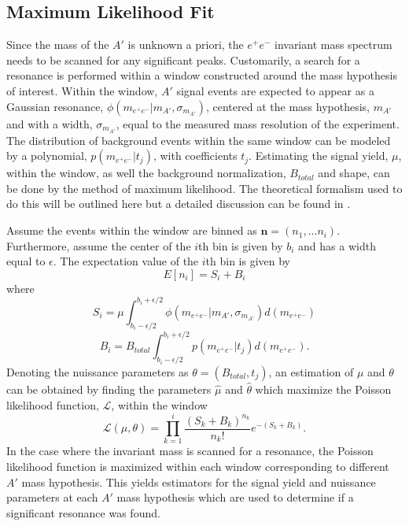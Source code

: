 \subsection{Maximum Likelihood Fit}

Since the mass of the $A'$ is unknown a priori, the 
$e^+e^-$ invariant mass spectrum needs to be scanned for any significant peaks.
Customarily, a search for a resonance is performed within a
window constructed around the mass hypothesis of interest.  Within the window, $A'$ 
signal events are expected to appear as a Gaussian resonance, 
$\phi(m_{e^+e^-} | m_{A'}, \sigma_{m_{A'}})$, centered at
the mass hypothesis, $m_{A'}$ and with a width, $\sigma_{m_{A'}}$, equal to the
 measured mass resolution of
the experiment.  The distribution of background events within the same window
can be modeled by a polynomial, $p(m_{e^+e^-} | t_j)$, with coefficients $t_j$.  Estimating the 
signal yield, $\mu$, within
the window, as well the background normalization, $B_{total}$ and shape, can be
done by the method of maximum likelihood.  The theoretical formalism
used to do this will be outlined here but a detailed discussion can be found in
\cite{Cowan:2010js}.

Assume the events within the window are binned as $\mathbf{n} = (n_{1}, ... n_{i})$.
Furthermore, assume the center of the $i$th bin is given by $b_i$ and has a width
equal to $\epsilon$. 
The expectation value of the $i$th bin is given by 
\begin{equation}
    E[n_i] = S_{i} + B_{i}
\end{equation}
where 
\begin{equation}
    S_{i} = \mu \int_{b_i - \epsilon/2}^{b_i + \epsilon/2} \phi(m_{e^+e^-} | m_{A'}, \sigma_{m_{A'}}) d (m_{e^+e^-})
\end{equation} 
\begin{equation}
    B_{i} = B_{total} \int_{b_i - \epsilon/2}^{b_i + \epsilon/2} p(m_{e^+e^-} | t_{j}) d (m_{e^+e^-}).
\end{equation}
Denoting the nuissance parameters as $\theta = (B_{total},  t_{j})$, an estimation
of $\mu$ and $\theta$ can be obtained by finding the parameters $\hat{\mu}$ and
$\hat{\theta}$ which maximize the Poisson likelihood function, $\mathcal{L}$, within
the window
\begin{equation}
    \mathcal{L}(\mu, \theta) = \prod_{k=1}^{i} \frac{(S_{k} + B_{k})^{n_k}}{n_{k}!} e^{-(S_{k} + B_{k})}. 
\end{equation}
In the case where the invariant mass is scanned for a resonance, the Poisson 
likelihood function is maximized within each window corresponding to different
$A'$ mass hypothesis. This yields estimators for the signal yield and nuissance
parameters at each $A'$ mass hypothesis which are used to determine if a significant 
resonance was found.

